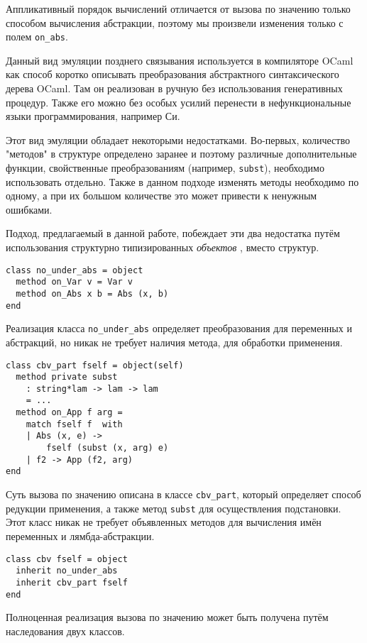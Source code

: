 Аппликативный порядок вычислений отличается от вызова по значению только способом вычисления абстракции, поэтому мы произвели изменения только с полем \lstinline{on_abs}.

Данный вид эмуляции позднего связывания используется в компиляторе OCaml как способ коротко описывать преобразования абстрактного синтаксического дерева OCaml. Там он реализован в ручную без использования генеративных процедур. Также его можно без особых усилий перенести в нефункциональные языки программирования, например Си.

Этот вид эмуляции обладает некоторыми недостатками. Во-первых, количество "методов" в структуре  определено заранее и поэтому различные дополнительные функции, свойственные преобразованиям (например, \lstinline{subst}), необходимо использовать отдельно. Также в данном подходе изменять методы необходимо по одному, а при их большом количестве это может привести к ненужным ошибками.

Подход, предлагаемый в данной работе, побеждает эти два недостатка путём использования структурно типизированных \emph{объектов} \ocaml, вместо структур.

\begin{lstlisting}
class no_under_abs = object
  method on_Var v = Var v 
  method on_Abs x b = Abs (x, b)
end
\end{lstlisting}

Реализация класса \lstinline{no_under_abs} определяет преобразования для переменных и абстракций, но никак не требует  наличия метода, для обработки применения.

\begin{lstlisting}
class cbv_part fself = object(self)
  method private subst 
    : string*lam -> lam -> lam 
    = ...
  method on_App f arg = 
    match fself f  with
    | Abs (x, e) -> 
        fself (subst (x, arg) e)
    | f2 -> App (f2, arg)
end
\end{lstlisting}

Суть вызова по значению описана в классе \lstinline{cbv_part}, который определяет способ редукции применения, а также метод \lstinline{subst} для осуществления подстановки. Этот класс никак не требует объявленных методов для вычисления имён переменных и лямбда-абстракции.

\begin{lstlisting}
class cbv fself = object
  inherit no_under_abs
  inherit cbv_part fself
end
\end{lstlisting}

Полноценная реализация вызова по значению может быть получена путём наследования двух классов.

